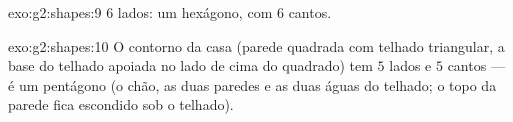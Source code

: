 \begin{solution}{exo:g2:shapes:9}
$6$ lados: um hexágono, com $6$ cantos.
\end{solution}

\begin{solution}{exo:g2:shapes:10}
O contorno da casa (parede quadrada com telhado triangular, a base
do telhado apoiada no lado de cima do quadrado) tem $5$ lados e $5$
cantos --- é um pentágono (o chão, as duas paredes e as duas águas
do telhado; o topo da parede fica escondido sob o telhado).
\end{solution}

